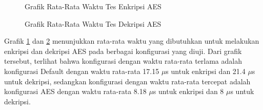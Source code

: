 \begin{figure}
    \centering
    \caption{Grafik Rata-Rata Waktu Tes Enkripsi AES}
    \label{fig:aes_encrypt_test_average_graph}
\end{figure}

\begin{figure}
    \centering
    \caption{Grafik Rata-Rata Waktu Tes Dekripsi AES}
    \label{fig:aes_decrypt_test_average_graph}
\end{figure}

Grafik \ref{fig:aes_encrypt_test_average_graph} dan \ref{fig:aes_decrypt_test_average_graph} menunjukkan rata-rata waktu yang dibutuhkan untuk melakukan enkripsi dan dekripsi AES pada berbagai konfigurasi yang diuji. Dari grafik tersebut, terlihat bahwa konfigurasi dengan waktu rata-rata terlama adalah konfigurasi Default dengan waktu rata-rata 17.15 $\mu$s untuk enkripsi dan 21.4 $\mu$s untuk dekripsi, sedangkan konfigurasi dengan waktu rata-rata tercepat adalah konfigurasi AES dengan waktu rata-rata 8.18 $\mu$s untuk enkripsi dan 8 $\mu$s untuk dekripsi.

